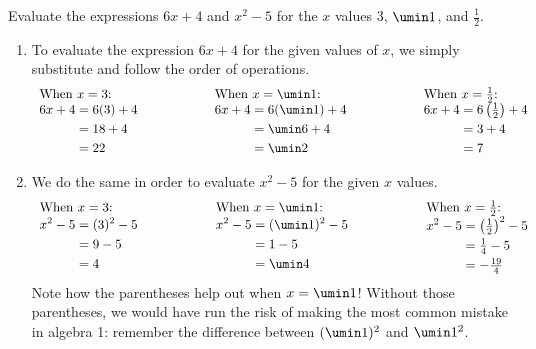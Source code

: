 \begin{boxedex}
\label{ex:evaluating}
Evaluate the expressions $6x+ 4$ and $x^2 - 5$ for the $x$ values 3, $\umin1$, and $\frac{1}{2}$.

\exsoln{}
\begin{enumerate}[label={(\alph*)}]
\item To evaluate the expression $6x + 4$ for the given values of $x$, we simply substitute and follow the order of operations.
\[
\begin{array}{lllll}
\text{When $x=3$:}
&
&
\text{When $x=\umin1$:}
&
&
\text{When $x=\frac{1}{2}$:}
\\ %
\begin{aligned}
6x + 4 & = 6(3) + 4\\
& = 18 + 4\\
& = 22
\end{aligned}
&
\qquad\qquad
&
\begin{aligned}
6x + 4 & = 6(\umin1) + 4\\
& = \umin6 + 4\\
& = \umin2
\end{aligned}
&
\qquad\qquad
&
\begin{aligned}
6x + 4 & = 6\left(\tfrac{1}{2}\right) + 4\\
& = 3 + 4\\
& = 7
\end{aligned}
\end{array}
\]

\item We do the same in order to evaluate $x^2 - 5$ for the given $x$ values.
\[
\begin{array}{lllll}
\text{When $x=3$:}
&
&
\text{When $x=\umin1$:}
&
&
\text{When $x=\frac{1}{2}$:}
\\ %
\begin{aligned}
x^2 - 5 & = (3)^2 - 5\\
& = 9 - 5\\
& = 4
\end{aligned}
&
\qquad\qquad
&
\begin{aligned}
x^2 - 5 & = (\umin1)^2 - 5\\
& = 1 - 5\\
& = \umin4
\end{aligned}
&
\qquad\qquad
&
\begin{aligned}
x^2 - 5 & = \left(\tfrac{1}{2}\right)^2 - 5\\
& = \tfrac{1}{4} - 5\\
& = -\tfrac{19}{4}
\end{aligned}
\end{array}
\]
Note how the parentheses help out when $x = \umin1$! Without those parentheses, we would have run the risk of making the most common mistake in algebra 1: remember the difference between $(\umin1)^2$ and $\umin1^2$.
\end{enumerate}
\end{boxedex}

